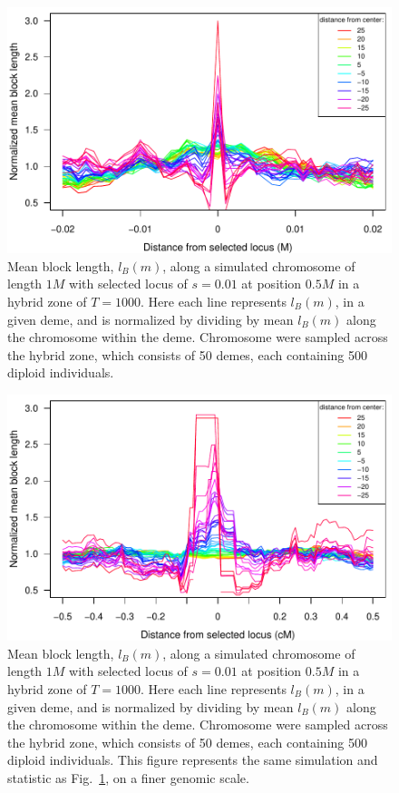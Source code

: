 \documentclass[11pt,letterpaper]{article}
\begin{document}
\begin{figure}
\includegraphics{figs/blocksAlongChromAncBConditioning}
\caption{Mean block length, $l_B(m)$, along a simulated chromosome of length $1M$ with selected locus of $s=0.01$ at position $0.5M$ in a hybrid zone of $T=1000$. Here each line represents  $l_B(m)$, in a given deme, and is normalized by dividing by mean $l_B(m)$ along the chromosome within the deme. Chromosome were sampled across the hybrid zone, which consists of 50 demes, each containing 500 diploid individuals.
}\label{Fig:blockLengths}
\end{figure}



\begin{figure}
\includegraphics{figs/blocksAlongChromAncBConditioningHighRes}
\caption{Mean block length, $l_B(m)$, along a simulated chromosome of length $1M$ with selected locus of $s=0.01$ at position $0.5M$ in a hybrid zone of $T=1000$. Here each line represents  $l_B(m)$, in a given deme, and is normalized by dividing by mean $l_B(m)$ along the chromosome within the deme. Chromosome were sampled across the hybrid zone, which consists of 50 demes, each containing 500 diploid individuals. This figure represents the same simulation and statistic as Fig.~\ref{Fig:blockLengths}, on a finer genomic scale.
}\label{Fig:blockLengthsZoom}
\end{figure}
\end{document}
